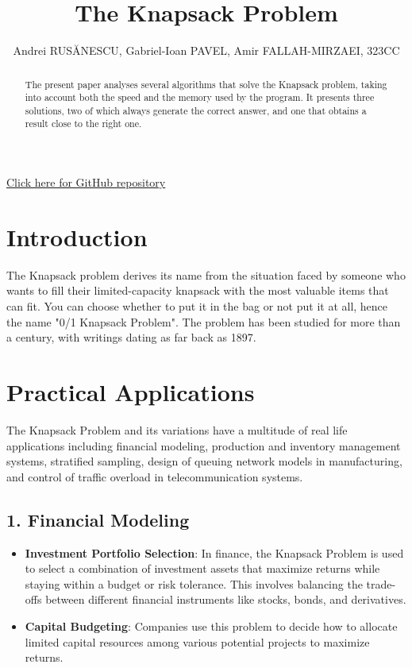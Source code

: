 \documentclass{llncs}
\begin{document}
%
\title{The Knapsack Problem}
%
\author{Andrei RUSĂNESCU,
Gabriel-Ioan PAVEL,
Amir FALLAH-MIRZAEI,
323CC}
%
%
\maketitle
%
\begin{center}
	\href{https://github.com/andreirusanescu/Algorithm-Analysis-Knapsack-Problem}{Click here for GitHub repository}
\end{center}
\begin{abstract}
The present paper analyses several algorithms that solve the Knapsack problem,
taking into account both the speed and the memory used by the program. It
presents three solutions, two of which always generate the correct answer, and
one that obtains a result close to the right one.

\end{abstract}
%
%
\section{Introduction}
The Knapsack problem derives its name from the situation faced by someone who wants
to fill their limited-capacity knapsack with the most valuable items that can fit.
You can choose whether to put it in the bag or not put it at all, hence the name
"0/1 Knapsack Problem". The problem has been studied for more than a century, with
writings dating as far back as 1897. 

\section{Practical Applications}
The Knapsack Problem and its variations have a multitude of real life applications
including financial modeling, production and inventory management systems, stratified
sampling, design of queuing network models in manufacturing, and control of traffic
overload in telecommunication systems.

\subsection*{1. Financial Modeling}
\begin{itemize}
    \item \textbf{Investment Portfolio Selection}: In finance, the Knapsack Problem
        is used to select a combination of investment assets that maximize returns while
        staying within a budget or risk tolerance. This involves balancing the trade-offs
        between different financial instruments like stocks, bonds, and derivatives.
    \item \textbf{Capital Budgeting}: Companies use this problem to decide how to
        allocate limited capital resources among various potential projects to maximize returns.
\end{itemize}
\end{document}
